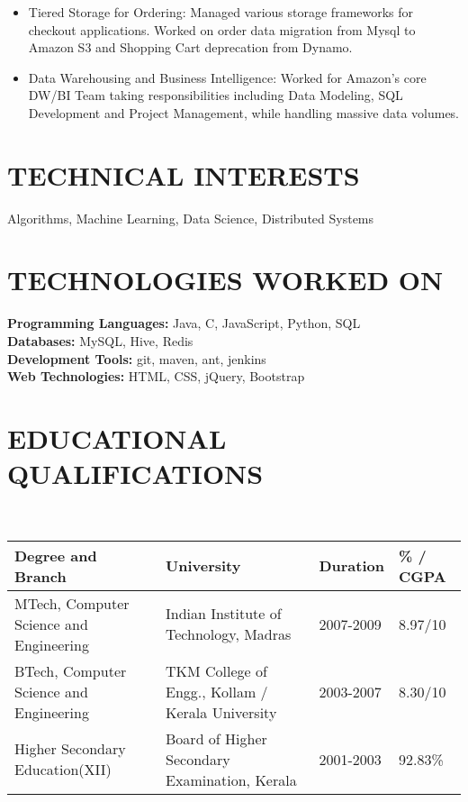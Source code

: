 \documentclass{res}
\begin{document}
\begin{resume}
\begin{itemize}

\item {Tiered Storage for Ordering:} Managed various storage frameworks for checkout applications. Worked on order data migration from Mysql to Amazon S3 and Shopping Cart deprecation from Dynamo.
\item {Data Warehousing and Business Intelligence:} Worked for Amazon's core DW/BI Team taking responsibilities including Data Modeling, SQL Development and Project Management, while handling massive data volumes. 
\end {itemize}

\section{TECHNICAL INTERESTS}  
Algorithms, Machine Learning, Data Science, Distributed Systems

\section{TECHNOLOGIES WORKED ON}
\textbf{Programming Languages:} Java, C, JavaScript, Python, SQL\\
\textbf{Databases:} MySQL, Hive, Redis\\
\textbf{Development Tools:} git, maven, ant, jenkins\\
\textbf{Web Technologies:} HTML, CSS, jQuery, Bootstrap

\section{EDUCATIONAL QUALIFICATIONS}				
\textbf{\\}
\begin{tabular}{| p{4.7cm}|p{5.5cm}|p{1.6cm}|p{1.7cm}|}
\hline \textbf{Degree and Branch} & \textbf{University} & \textbf{Duration} & \textbf{\% / CGPA} \\ 
\hline MTech, Computer Science and  Engineering & Indian Institute of Technology, Madras & 2007-2009 & 8.97/10 \\ 
\hline BTech, Computer Science and  Engineering & TKM College of Engg., Kollam / Kerala University & 2003-2007 & 8.30/10 \\ 
\hline Higher Secondary Education(XII) & Board of Higher Secondary Examination, Kerala & 2001-2003 & 92.83\% \\ 

\hline 
\end{tabular} 


\end{resume}
\end{document}
